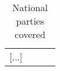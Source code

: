 \begin{footnotesize}
\begin{longtable}{lrll}
\caption{National parties covered}
[...] 
\end{longtable}
\end{footnotesize}
